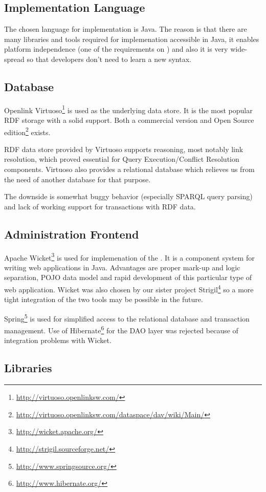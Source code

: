 \subsection{Implementation Language}
The chosen language for implementation is Java. The reason is that there are many libraries and tools required for implemenation accessible in Java, it enables platform independence (one of the requirements on \odcs) and also it is very wide-spread so that developers don't need to learn a new syntax.

\subsection{Database}
Openlink Virtuoso\footnote{\url{http://virtuoso.openlinksw.com/}} is used as the underlying data store. It is the most popular RDF storage with a solid support. Both a commercial version and Open Source edition\footnote{\url{http://virtuoso.openlinksw.com/dataspace/dav/wiki/Main/}} exists.

RDF data store provided by Virtuoso supports reasoning, most notably  link resolution, which proved essential for Query Execution/Conflict Resolution components. Virtuoso also provides a relational database which relieves us from the need of another database for that purpose.

The downside is somewhat buggy behavior (especially SPARQL query parsing) and lack of working support for transactions with RDF data.

\subsection{Administration Frontend}
Apache Wicket\footnote{\url{http://wicket.apache.org/}} is used for implemenation of the \FE. It is a component system for writing web applications in Java. Advantages are proper mark-up and logic separation, POJO data model and rapid development of this particular type of web application. Wicket was also chosen by our sister project Strigil\footnote{\url{http://strigil.sourceforge.net/}} so a more tight integration of the two tools may be possible in the future.

Spring\footnote{\url{http://www.springsource.org/}} is used for simplified access to the relational database and transaction management. Use of Hibernate\footnote{\url{http://www.hibernate.org/}} for the DAO layer was rejected because of integration problems with Wicket.

\subsection{Libraries}
